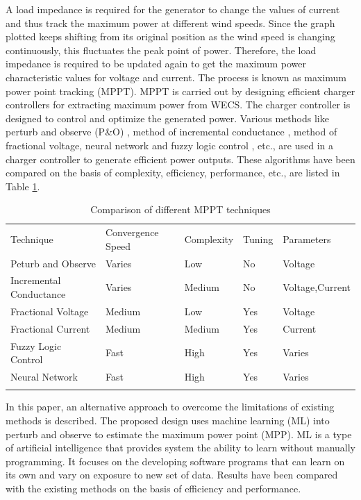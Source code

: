 A load impedance is required for the generator to change the values of current and thus track the maximum power at different wind speeds. Since the graph plotted keeps shifting from its original position as the wind speed is changing continuously, this fluctuates the peak point of power. Therefore, the load impedance is required to be updated again to get the maximum power characteristic values for voltage and current. The process is known as maximum power point tracking (MPPT). MPPT is carried out by designing efficient charger controllers for extracting maximum power from WECS. The charger controller is designed to control and optimize the generated power. Various methods like perturb and observe (P\&O) \cite{RefJ3}, method of incremental conductance \cite{RefJ4}, method of fractional voltage\cite{RefJ5}, neural network \cite{RefJ6} and fuzzy logic control \cite{RefJ7}, etc., are  used in a charger controller to generate efficient power outputs. These algorithms have been compared on the basis of complexity, efficiency, performance, etc., are listed in Table \ref{Table:1}.
\begin{table}
\label{Table:1}       %
\caption{ Comparison of  different MPPT techniques \cite{RefJ6}}
\begin{tabular}{lllll}
\hline\noalign{\smallskip}
Technique & Convergence Speed & Complexity &Tuning & Parameters  \\
\noalign{\smallskip}\hline\noalign{\smallskip}
Peturb and Observe & Varies & Low &  No & Voltage \\
Incremental Conductance  &  Varies & Medium & No & Voltage,Current \\
Fractional Voltage & Medium & Low & Yes & Voltage \\
Fractional Current & Medium & Medium & Yes & Current \\
Fuzzy Logic Control & Fast & High & Yes & Varies \\
Neural Network & Fast & High & Yes & Varies \\
\noalign{\smallskip}\hline
\end{tabular}
\end{table}
In this paper, an alternative approach to overcome the limitations of existing methods is described. The proposed design uses machine learning (ML) into perturb and observe to estimate the maximum power point (MPP). ML is a type of artificial intelligence that provides system the ability to learn without manually programming. It focuses on the developing software programs that can learn on its own and vary on exposure to new set of data. Results have been compared with the existing methods on the basis of efficiency and performance.
